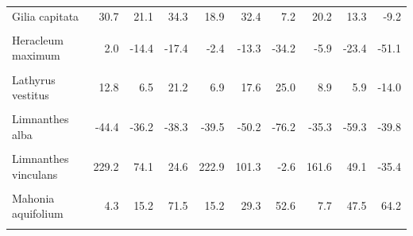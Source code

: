 \begin{longtable}[t]{lrrrrrrrrr}
Gilia capitata & 30.7 & 21.1 & 34.3 & 18.9 & 32.4 & 7.2 & 20.2 & 13.3 & -9.2\\
\cellcolor{gray!10}{Hackelia patens} & \cellcolor{gray!10}{NA} & \cellcolor{gray!10}{NA} & \cellcolor{gray!10}{NA} & \cellcolor{gray!10}{NA} & \cellcolor{gray!10}{NA} & \cellcolor{gray!10}{NA} & \cellcolor{gray!10}{NA} & \cellcolor{gray!10}{NA} & \cellcolor{gray!10}{NA}\\
\addlinespace
Heracleum maximum & 2.0 & -14.4 & -17.4 & -2.4 & -13.3 & -34.2 & -5.9 & -23.4 & -51.1\\
\cellcolor{gray!10}{Hydrophyllum capitatum} & \cellcolor{gray!10}{86.7} & \cellcolor{gray!10}{103.9} & \cellcolor{gray!10}{201.8} & \cellcolor{gray!10}{201.6} & \cellcolor{gray!10}{182.6} & \cellcolor{gray!10}{228.4} & \cellcolor{gray!10}{189.1} & \cellcolor{gray!10}{161.8} & \cellcolor{gray!10}{214.5}\\
Lathyrus vestitus & 12.8 & 6.5 & 21.2 & 6.9 & 17.6 & 25.0 & 8.9 & 5.9 & -14.0\\
\cellcolor{gray!10}{Lepidium montanum} & \cellcolor{gray!10}{-63.4} & \cellcolor{gray!10}{-47.9} & \cellcolor{gray!10}{-67.6} & \cellcolor{gray!10}{-55.0} & \cellcolor{gray!10}{-71.8} & \cellcolor{gray!10}{-71.3} & \cellcolor{gray!10}{-67.2} & \cellcolor{gray!10}{-67.0} & \cellcolor{gray!10}{-46.0}\\
Limnanthes alba & -44.4 & -36.2 & -38.3 & -39.5 & -50.2 & -76.2 & -35.3 & -59.3 & -39.8\\
\addlinespace
\cellcolor{gray!10}{Limnanthes douglasii} & \cellcolor{gray!10}{-34.5} & \cellcolor{gray!10}{-51.2} & \cellcolor{gray!10}{-69.9} & \cellcolor{gray!10}{-28.6} & \cellcolor{gray!10}{-47.5} & \cellcolor{gray!10}{-90.7} & \cellcolor{gray!10}{-25.3} & \cellcolor{gray!10}{-67.9} & \cellcolor{gray!10}{-89.4}\\
Limnanthes vinculans & 229.2 & 74.1 & 24.6 & 222.9 & 101.3 & -2.6 & 161.6 & 49.1 & -35.4\\
\cellcolor{gray!10}{Lupinus perennis} & \cellcolor{gray!10}{NA} & \cellcolor{gray!10}{NA} & \cellcolor{gray!10}{NA} & \cellcolor{gray!10}{NA} & \cellcolor{gray!10}{NA} & \cellcolor{gray!10}{NA} & \cellcolor{gray!10}{NA} & \cellcolor{gray!10}{NA} & \cellcolor{gray!10}{NA}\\
Mahonia aquifolium & 4.3 & 15.2 & 71.5 & 15.2 & 29.3 & 52.6 & 7.7 & 47.5 & 64.2\\
\cellcolor{gray!10}{Mahonia dictyota} & \cellcolor{gray!10}{20.0} & \cellcolor{gray!10}{16.9} & \cellcolor{gray!10}{22.5} & \cellcolor{gray!10}{8.3} & \cellcolor{gray!10}{25.8} & \cellcolor{gray!10}{13.3} & \cellcolor{gray!10}{2.3} & \cellcolor{gray!10}{14.2} & \cellcolor{gray!10}{7.8}\\

\end{longtable}
